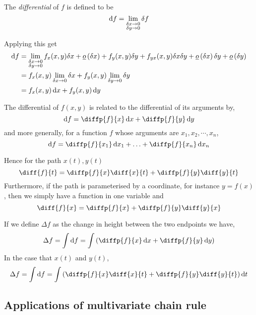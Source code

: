 \documentclass{article}
\begin{document}
\begin{defi}[Differential]
    The \emph{differential} of $f$ is defined to be
    \[
        \mathop{}\!\mathrm{d} f = \lim_{\substack{\delta x \rightarrow 0 \\ \delta y \rightarrow 0}} \delta f  
    \]
\end{defi}
Applying this get
\begin{align*}
    \mathop{}\!\mathrm{d} f &= \lim_{\substack{\delta x \rightarrow 0 \\ \delta y \rightarrow 0}} f_x(x, y)\delta x + \underline{o}\left( \delta x \right) + f_y(x, y)\delta y + f_{yx}(x, y)\delta x\delta y + \underline{o}\left( \delta x \right)\delta y + \underline{o}\left( \delta y \right) \\
    &= f_x(x, y) \lim_{\delta x \rightarrow 0} \delta x + f_y(x, y) \lim_{\delta y \rightarrow 0}\delta y \\
    &= f_x(x, y) \mathop{}\!\mathrm{d} x + f_y(x, y) \mathop{}\!\mathrm{d} y
\end{align*}

\begin{thm}
    The differential of $f(x, y)$ is related to the differential of its arguments by,
    \[
        \diffd f = \diffp{f}{x} \diffd x + \diffp{f}{y} \diffd y
    \] 
    and more generally, for a function $f$ whose arguments are $x_1, x_2, \cdots, x_n$,
    \[
        \diffd f = \diffp{f}{{x_1}} \diffd x_1 + \ldots + \diffp{f}{{x_n}} \diffd x_n
    \]
\end{thm}

Hence for the path $x(t), y(t)$
\[
    \diff{f}{t} = \diffp{f}{x} \diff{x}{t} + \diffp{f}{y} \diff{y}{t}
\]
Furthermore, if the path is parameterised by a coordinate, for instance $y = f(x)$, then we simply have a function in one variable and
\[
    \diff{f}{x} = \diffp{f}{x} + \diffp{f}{y} \diff{y}{x}
\]

\begin{defi}
    If we define $\Delta f$ as the change in height between the two endpoints we have,
    \[
        \Delta f = \int{\diffd f} = \int{\bkt{\diffp{f}{x} \diffd x + \diffp{f}{y} \diffd y}}  
    \]
    In the case that $x(t)$ and $y(t)$,
    \[
        \Delta f = \int{\diffd f} = \int{\bkt{\diffp{f}{x} \diff{x}{t} + \diffp{f}{y} \diff{y}{t}} \diffd t}  
    \]
\end{defi}
\subsection{Applications of multivariate chain rule}
\end{document}
